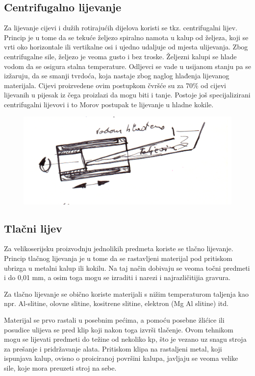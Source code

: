 \documentclass[a4paper,12pt]{article}
\numberwithin{figure}{section}
\begin{document}
\subsection{Centrifugalno lijevanje}
Za lijevanje cijevi i dužih rotirajućih dijelova koristi se tkz. centrifugalni lijev. Princip je u tome da se tekuće željezo spiralno namota u kalup od željeza, koji se vrti oko horizontale ili vertikalne osi i ujedno udaljuje od mjesta ulijevanja. Zbog centrifugalne sile, željezo je veoma gusto i bez troske. Željezni kalupi se hlade vodom da se osigura stalna temperature. Odljevci se vade u usijanom stanju pa se izžaruju, da se smanji tvrdoća, koja nastaje zbog naglog hlađenja lijevanog materijala. Cijevi proizvedene ovim postupkom čvršće su za 70$\%$ od cijevi lijevanih u pijesak iz čega proizlazi da mogu biti i tanje. Postoje još specijalizirani centrifugalni lijevovi i to Morov postupak te lijevanje u hladne kokile.
\begin{figure}[!h]
\centering
\includegraphics[scale=0.17]{image_60-2.png}
\end{figure}
\FloatBarrier
\subsection{Tlačni lijev}
Za velikoserijsku proizvodnju jednolikih predmeta koriste se tlačno lijevanje. Princip tlačnog lijevanja je u tome da se rastavljeni materijal pod pritiskom ubrizga u metalni kalup ili kokilu. Na taj način dobivaju se veoma točni predmeti  i do 0,01 mm, a osim toga mogu se izraditi i narezi i najrazličitijia gravura. \par 
Za tlačno lijevanje se obično koriste materijali s nižim temperaturom taljenja kao npr. Al-slitine, olovne slitine, kositrene slitine, elektron (Mg Al slitine) itd.\par 
Materijal se prvo rastali u posebnim pećima, a pomoću posebne žlićice ili posudice ulijeva se pred klip koji nakon toga izvrši tlačenje. Ovom tehnikom mogu se lijevati predmeti do težine od nekoliko kp, što je vezano uz snagu stroja za prešanje i pridržavanje alata. Pritiskom klipa na rastaljeni metal, koji ispunjava kalup, ovisno o proiciranoj površini kalupa, javljaju se veoma velike sile, koje mora preuzeti stroj na sebe.
\end{document}
